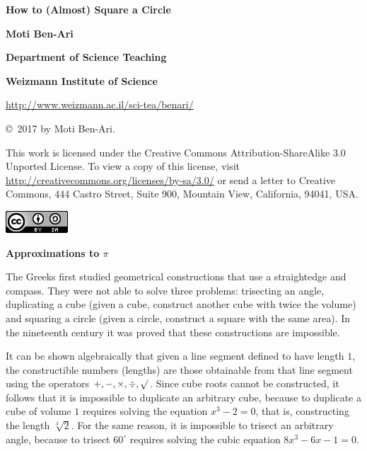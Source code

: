 \documentclass[11pt,a4paper]{report}
\begin{document}
\thispagestyle{empty}

\begin{center}

\textbf{\huge How to (Almost) Square a Circle}

\bigskip
\bigskip
\bigskip

\textbf{\LARGE Moti Ben-Ari}

\bigskip

\textbf{\Large Department of Science Teaching}

\bigskip

\textbf{\Large Weizmann Institute of Science}

\bigskip

\url{http://www.weizmann.ac.il/sci-tea/benari/}

\end{center}

\bigskip
\bigskip

\begin{center}
\copyright{}\  2017 by Moti Ben-Ari.
\end{center}

This work is licensed under the Creative Commons Attribution-ShareAlike 3.0 Unported License. To view a copy of this license, visit \url{http://creativecommons.org/licenses/by-sa/3.0/} or send a letter to Creative Commons, 444 Castro Street, Suite 900, Mountain View, California, 94041, USA.

\bigskip

\begin{center}
\includegraphics[width=.2\textwidth]{../by-sa.png}
\end{center}

\newpage

\begin{center}
\textbf{\Large Approximations to $\pi$}
\end{center}

The Greeks first studied geometrical constructions that use a straightedge and compass. They were not able to solve three problems: trisecting an angle, duplicating a cube (given a cube, construct another cube with twice the volume) and squaring a circle (given a circle, construct a square with the same area). In the nineteenth century it was proved that these constructions are impossible.

It can be shown algebraically that given a line segment defined to have length $1$, the constructible numbers (lengths) are those obtainable from that line segment using the operators $+,-,\times,\div,\surd$. Since cube roots cannot be constructed, it follows that it is impossible to duplicate an arbitrary cube, because to duplicate a cube of volume $1$ requires solving the equation $x^3-2=0$, that is, constructing the length $\sqrt[3]{2}$. For the same reason, it is impossible to trisect an arbitrary angle, because to trisect $60^\circ$ requires solving the cubic equation $8x^3-6x-1=0$.
\end{document}
